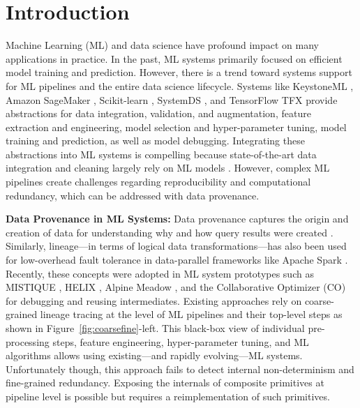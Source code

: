 \section{Introduction}
\label{sec:intro}

Machine Learning (ML) and data science have profound impact on many applications in practice. In the past, ML systems primarily focused on efficient model training and prediction. However, there is a trend toward systems support for ML pipelines and the entire data science lifecycle. Systems like KeystoneML \cite{SparksVKFR17}, Amazon SageMaker \cite{LibertyKXRCNDSA20}, Scikit-learn \cite{PedregosaVGMTGBPWDVPCBPD11}, SystemDS \cite{BoehmADGIKLPR20}, and TensorFlow TFX \cite{BaylorBCFFHHIJK17} provide abstractions for data integration, validation, and augmentation, feature extraction and engineering, model selection and hyper-parameter tuning, model training and prediction, as well as model debugging. Integrating these abstractions into ML systems is compelling because state-of-the-art data integration and cleaning largely rely on ML models \cite{DongR18}. However, complex ML pipelines create challenges regarding reproducibility and computational redundancy, which can be addressed with data provenance. 

\textbf{Data Provenance in ML Systems:} Data provenance captures the origin and creation of data for understanding why and how query results were created \cite{GlavicD07,CheneyCT09,Tan07}. Similarly, lineage---in terms of logical data transformations---has also been used for low-overhead fault tolerance in data-parallel frameworks like Apache Spark \cite{ZahariaCDDMMFSS12}. Recently, these concepts were adopted in ML system prototypes such as MISTIQUE \cite{VartakTMZ18}, HELIX \cite{XinMMLSP18}, Alpine Meadow \cite{ShangZBKECBUK19}, and the Collaborative Optimizer (CO) \cite{DerakhshanMARM20} for debugging and reusing intermediates. Existing approaches rely on coarse-grained lineage tracing at the level of ML pipelines and their top-level steps as shown in Figure~\ref{fig:coarsefine}-left. This black-box view of individual pre-processing steps, feature engineering, hyper-parameter tuning, and ML algorithms allows using existing---and rapidly evolving---ML systems. Unfortunately though, this approach fails to detect internal non-determinism and fine-grained redundancy. Exposing the internals of composite primitives at pipeline level is possible but requires a reimplementation of such primitives.

